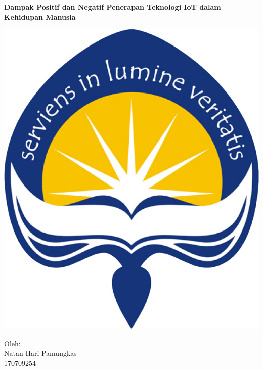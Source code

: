 \documentclass[12pt, letterpaper]{article}
\begin{document}
\begin{titlepage} 
  \begin{center}   
    \LARGE
    \textbf{Dampak Positif dan Negatif Penerapan Teknologi IoT dalam Kehidupan Manusia}
  \end{center}
  \begin{center}
    \vspace{1cm}
    \includegraphics[scale=6]{logo_uajy}
    \vspace{0.5cm}
  \end{center}
  \begin{center}
    \Large
    Oleh:\\
    Natan Hari Pamungkas\\
    170709254
  \end{center}
\end{titlepage}
\end{document}
